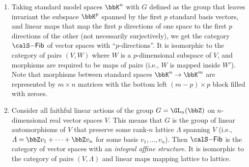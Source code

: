 \begin{example}
\begin{enumerate}
        \item Taking standard model spaces $\bbK^n$ with $G$ defined as the group that leaves invariant the subspace $\bbK^p$ spanned by the first $p$ standard basis vectors, and linear maps that map the first $p$ directions of one space to the first $p$ directions of the other (not necessarily surjectively), we get the category $\calS\mathsf{-Fib}$ of vector spaces with ``$p$-directions''. It is isomorphic to the category of pairs $(V,W)$ where $W$ is a $p$-dimensional subspace of $V$, and morphisms are required to be maps of pairs (i.e., $W$ is mapped inside $W'$). Note that morphisms between standard spaces $\bbK^n\to \bbK^m$ are represented by $m\times n$ matrices with the bottom left $(m-p)\times p$ block filled with zeroes.

        \item Consider all faithful linear actions of the group $G=\GL_n(\bbZ)$ on $n$-dimensional real vector spaces $V$. This means that $G$ is the group of linear automorphisms of $V$ that preserve some rank-$n$ lattice $\varLambda$ spanning $V$ (i.e., $\varLambda=\bbZ v_1+\cdots +\bbZ v_n$ for some basis $v_1,\ldots,v_n$). Then $\calS\mathsf{-Fib}$ is the category of vector spaces with an \emph{integral affine structure}. It is isomorphic to the category of pairs $(V,\varLambda)$ and linear maps mapping lattice to lattice.


\end{enumerate}
\end{example}
